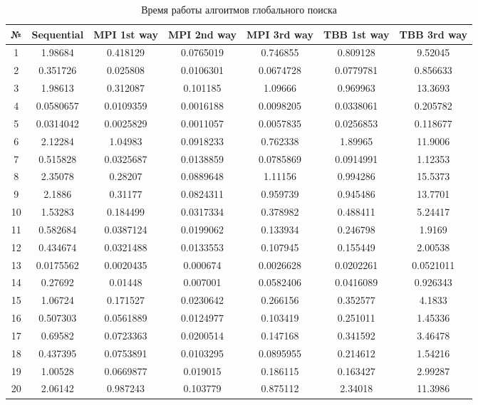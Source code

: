 \documentclass{report}
\begin{document}
\begin{table}[!h]
\centering
\begin{tabular}{ | c | c | c | c | c | c | c | }
\hline
№  & Sequential      & MPI 1st way  & MPI 2nd way & MPI 3rd way & TBB 1st way & TBB 3rd way  \\ \hline
1  & 1.98684 &  0.418129 & 0.0765019 & 0.746855  & 0.809128 & 9.52045 \\ \hline
2  & 0.351726 &  0.025808 & 0.0106301 & 0.0674728 & 0.0779781 & 0.856633 \\ \hline
3  & 1.98613 &  0.312087 & 0.101185  & 1.09666 & 0.969963 & 13.3693 \\ \hline
4  & 0.0580657 &  0.0109359& 0.0016188 & 0.0098205 & 0.0338061 & 0.205782 \\ \hline
5  & 0.0314042 &  0.0025829& 0.0011057 & 0.0057835& 0.0256853 & 0.118677 \\ \hline
6  & 2.12284 &  1.04983  & 0.0918233 & 0.762338 & 1.89965 & 11.9006 \\ \hline
7  & 0.515828 &  0.0325687 & 0.0138859 & 0.0785869 & 0.0914991 & 1.12353 \\ \hline
8  & 2.35078 &  0.28207 & 0.0889648  & 1.11156 & 0.994286 & 15.5373 \\ \hline
9  & 2.1886 &  0.31177 & 0.0824311 & 0.959739 & 0.945486 & 13.7701 \\ \hline
10 & 1.53283 &  0.184499 & 0.0317334 & 0.378982 & 0.488411   & 5.24417 \\ \hline
11 & 0.582684 &  0.0387124 & 0.0199062 & 0.133934 & 0.246798 & 1.9169 \\ \hline
12 & 0.434674 &  0.0321488  & 0.0133553  & 0.107945 & 0.155449 & 2.00538 \\ \hline
13 & 0.0175562 &  0.0020435& 0.000674 & 0.0026628& 0.0202261  & 0.0521011 \\ \hline
14 & 0.27692 &  0.01448  & 0.007001 & 0.0582406 & 0.0416089 & 0.926343 \\ \hline
15 & 1.06724 &  0.171527 & 0.0230642 & 0.266156 & 0.352577 & 4.1833 \\ \hline
16 & 0.507303 &  0.0561889 & 0.0124977 & 0.103419 & 0.251011 & 1.45336 \\ \hline
17 & 0.69582 &  0.0723363 & 0.0200514  & 0.147168 & 0.341592 & 3.46478 \\ \hline
18 & 0.437395 &  0.0753891 & 0.0103295   & 0.0895955 & 0.214612 & 1.54216 \\ \hline
19 & 1.00528 &  0.0669877 & 0.019015  & 0.186115 & 0.163427 & 2.99287 \\ \hline
20 & 2.06142 &  0.987243 & 0.103779 & 0.875112 & 2.34018 & 11.3986 \\ \hline
\end{tabular}
\caption{Время работы алгоитмов глобального поиска}
\end{table}
\end{document}
